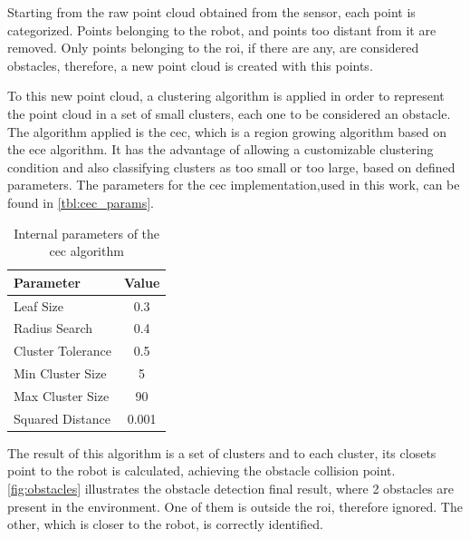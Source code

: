 \par Starting from the raw point cloud obtained from the sensor, each point is categorized. Points belonging to the robot, and points too distant from it are removed. Only points belonging to the \ac{roi}, if there are any, are considered obstacles, therefore, a new point cloud is created with this points.

\par To this new point cloud, a clustering algorithm is applied in order to represent the point cloud in a set of small clusters, each one to be considered an obstacle. The algorithm applied is the \ac{cec}, which is a region growing algorithm based on the \ac{ece} algorithm. It has the advantage of allowing a customizable clustering condition and also classifying clusters as too small or too large, based on defined parameters. The parameters for the \ac{cec} implementation,used in this work, can be found in \autoref{tbl:cec_params}.

\begin{table}[h]
    \centering
    \begin{tabular}{|l|c|}
    \hline
    \textbf{Parameter} & \textbf{Value} \\ \hline
    Leaf Size & 0.3 \\ \hline
    Radius Search & 0.4 \\ \hline
    Cluster Tolerance & 0.5 \\ \hline
    Min Cluster Size & 5 \\ \hline
    Max Cluster Size & 90 \\ \hline
    Squared Distance & 0.001 \\ \hline
    \end{tabular}
    \caption{Internal parameters of the \ac{cec} algorithm}
    \label{tbl:cec_params}
\end{table}

\par The result of this algorithm is a set of clusters and to each cluster, its closets point to the robot is calculated, achieving the obstacle collision point. \autoref{fig:obstacles} illustrates the obstacle detection final result, where 2 obstacles are present in the environment. One of them is outside the \ac{roi}, therefore ignored. The other, which is closer to the robot, is correctly identified.


